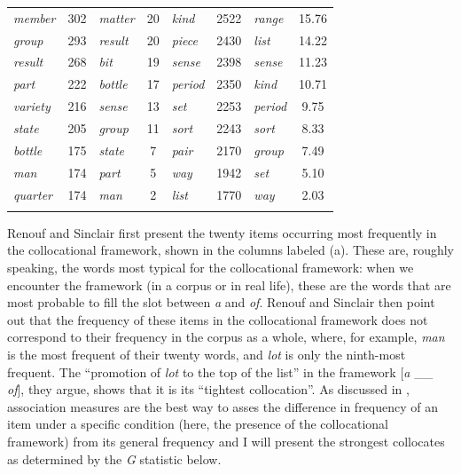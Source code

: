 \begin{table}
{\begin{tabular}[t]{lSlS|lSlS}
\textit{member} & 302 & \textit{matter} & 20 & \textit{kind} & 2522 & \textit{range} & 15.76 \\
\textit{group} & 293 & \textit{result} & 20 & \textit{piece} & 2430 & \textit{list} & 14.22 \\
\textit{result} & 268 & \textit{bit} & 19 & \textit{sense} & 2398 & \textit{sense} & 11.23 \\
\textit{part} & 222 & \textit{bottle} & 17 & \textit{period} & 2350 & \textit{kind} & 10.71 \\
\textit{variety} & 216 & \textit{sense} & 13 & \textit{set} & 2253 & \textit{period} & 9.75 \\
\textit{state} & 205 & \textit{group} & 11 & \textit{sort} & 2243 & \textit{sort} & 8.33 \\
\textit{bottle} & 175 & \textit{state} & 7 & \textit{pair} & 2170 & \textit{group} & 7.49 \\
\textit{man} & 174 & \textit{part} & 5 & \textit{way} & 1942 & \textit{set} & 5.10 \\
\textit{quarter} & 174 & \textit{man} & 2 & \textit{list} & 1770 & \textit{way} & 2.03 \\
\lspbottomrule
\end{tabular}}
\end{table}

Renouf and Sinclair first present the twenty items occurring most frequently in the collocational  framework,  shown in the columns labeled (a). These are, roughly speaking, the words most typical for the collocational framework: when we encounter the framework (in a corpus or in real life), these are the words that are most probable to fill the slot between \textit{a} and \textit{of}. Renouf and Sinclair then point out that the frequency  of these items in the collocational framework  does not correspond to their frequency in the corpus as a whole, where, for example, \textit{man} is the most frequent of their twenty words, and \textit{lot} is only the ninth\hyp{}most frequent. The ``promotion of \textit{lot} to the top of the list'' in the framework [\textit{a} \_\_ \textit{of}], they argue, shows that it is its ``tightest collocation''.  As discussed in , association  measures  are the best way to asses the difference in frequency  of an item under a specific condition (here, the presence of the collocational framework)  from its general frequency and I will present the strongest collocates as determined by the \emph{G} statistic  below.

